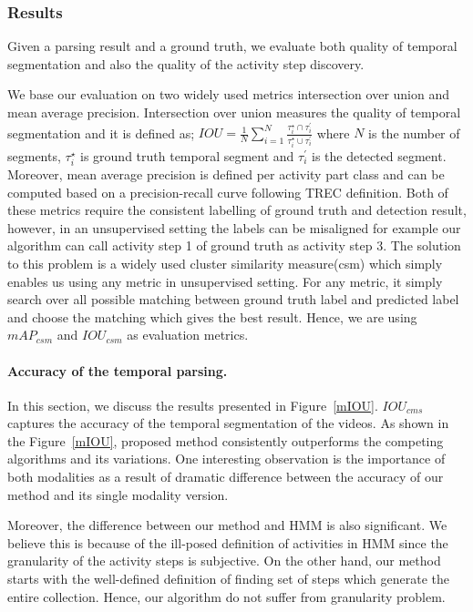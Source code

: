\subsubsection{Results}
Given a parsing result and a ground truth, we evaluate both quality of temporal segmentation and also the quality of the activity step discovery. 

We base our evaluation on two widely used metrics intersection over union and mean average precision. Intersection over union measures the quality of temporal segmentation and it is defined as; $IOU=\frac{1}{N}\sum_{i=1}^N \frac{\tau^\star_i \cap \tau^\prime_{i}}{\tau^\star_i \cup \tau^\prime_{i}}$ where $N$ is the number of segments, $\tau^\star_i$ is ground truth temporal segment and $\tau^\prime_{i}$ is the detected segment. Moreover, mean average precision is defined per activity part class and can be computed based on a precision-recall curve following TREC\cite{trecc} definition. Both of these metrics require the consistent labelling of ground truth and detection result, however, in an unsupervised setting the labels can be misaligned for example our algorithm can call activity step 1 of ground truth as activity step 3. The solution to this problem is a widely used cluster similarity measure(csm)\cite{liao05} which simply enables us using any metric in unsupervised setting. For any metric, it simply search over all possible matching between ground truth label and predicted label and choose the matching which gives the best result. Hence, we are using $mAP_{csm}$ and $IOU_{csm}$ as evaluation metrics.


\paragraph{Accuracy of the temporal parsing.}
In this section, we discuss the results presented in Figure~\ref{mIOU}. $IOU_{cms}$ captures the accuracy of the temporal segmentation of the videos. As shown in the Figure~\ref{mIOU}, proposed method consistently outperforms the competing algorithms and its variations. One interesting observation is the importance of both modalities as a result of dramatic difference between the accuracy of our method and its single modality version.

Moreover, the difference between our method and HMM is also significant. We believe this is because of the ill-posed definition of activities in HMM since the granularity of the activity steps is subjective. On the other hand, our method starts with the well-defined definition of finding set of steps which generate the entire collection. Hence, our algorithm do not suffer from granularity problem.

